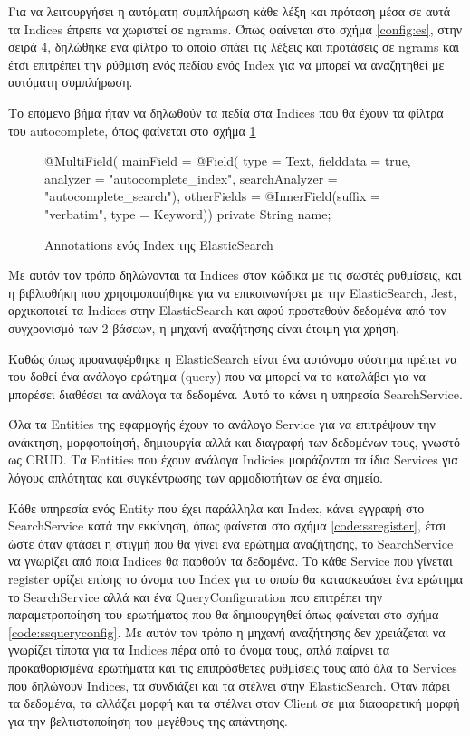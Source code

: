 Για να λειτουργήσει η αυτόματη συμπλήρωση κάθε λέξη και πρόταση μέσα σε αυτά τα Indices έπρεπε να χωριστεί σε ngrams. Όπως φαίνεται στο σχήμα \ref{config:es}, στην σειρά 4, δηλώθηκε ενα φίλτρο το οποίο σπάει τις λέξεις και προτάσεις σε ngrams και έτσι επιτρέπει την ρύθμιση ενός πεδίου ενός Index για να μπορεί να αναζητηθεί με αυτόματη συμπλήρωση.

Το επόμενο βήμα ήταν να δηλωθούν τα πεδία στα Indices που θα έχουν τα φίλτρα του autocomplete, όπως φαίνεται στο σχήμα \ref{code:index}

\begin{figure}[h]
    \begin{javacode}
@MultiField(
    mainField = @Field(
        type = Text, 
        fielddata = true,
        analyzer = "autocomplete_index", 
        searchAnalyzer = "autocomplete_search"),
    otherFields = {@InnerField(suffix = "verbatim", type = Keyword)})
private String name;
    \end{javacode}
    \caption{Annotations ενός Index της ElasticSearch}
   \label{code:index}
\end{figure}

Με αυτόν τον τρόπο δηλώνονται τα Indices στον κώδικα με τις σωστές ρυθμίσεις, και η βιβλιοθήκη που χρησιμοποιήθηκε για να επικοινωνήσει με την ElasticSearch, Jest, αρχικοποιεί τα Indices στην ElasticSearch και αφού προστεθούν δεδομένα από τον συγχρονισμό των 2 βάσεων, η μηχανή αναζήτησης είναι έτοιμη για χρήση.

Καθώς όπως προαναφέρθηκε η ElasticSearch είναι ένα αυτόνομο σύστημα πρέπει να του δοθεί ένα ανάλογο ερώτημα (query) που να μπορεί να το καταλάβει για να μπορέσει διαθέσει τα ανάλογα τα δεδομένα. Αυτό το κάνει η υπηρεσία SearchService.

Όλα τα Entities της εφαρμογής έχουν το ανάλογο Service για να επιτρέψουν την ανάκτηση, μορφοποίησή, δημιουργία αλλά και διαγραφή των δεδομένων τους, γνωστό ως CRUD. Τα Entities που έχουν ανάλογα Indicies μοιράζονται τα ίδια Services για λόγους απλότητας και συγκέντρωσης των αρμοδιοτήτων σε ένα σημείο. 

Κάθε υπηρεσία ενός Entity που έχει παράλληλα και Index, κάνει εγγραφή στο SearchService κατά την εκκίνηση, όπως φαίνεται στο σχήμα \ref{code:ssregister}, έτσι ώστε όταν φτάσει η στιγμή που θα γίνει ένα ερώτημα αναζήτησης, το SearchService να γνωρίζει από ποια Indices θα παρθούν τα δεδομένα. Το κάθε Service που γίνεται register ορίζει επίσης το όνομα του Index για το οποίο θα κατασκευάσει ένα ερώτημα το SearchService αλλά και ένα QueryConfiguration που επιτρέπει την παραμετροποίηση του ερωτήματος που θα δημιουργηθεί όπως φαίνεται στο σχήμα \ref{code:ssqueryconfig}. Με αυτόν τον τρόπο η μηχανή αναζήτησης δεν χρειάζεται να γνωρίζει τίποτα για τα Indices πέρα από το όνομα τους, απλά παίρνει τα προκαθορισμένα ερωτήματα και τις επιπρόσθετες ρυθμίσεις τους από όλα τα Services που δηλώνουν Indices, τα συνδιάζει και τα στέλνει στην ElasticSearch. Όταν πάρει τα δεδομένα, τα αλλάζει μορφή και τα στέλνει στον Client σε μια διαφορετική μορφή για την βελτιστοποίηση του μεγέθους της απάντησης. 

